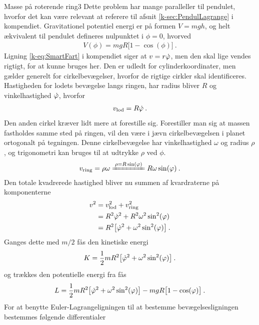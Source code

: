 %
%
\begin{opgave}{Masse på roterende ring}{3}
Dette problem har mange paralleller til pendulet, hvorfor det kan være relevant at referere til afsnit \ref{k-sec:PendulLagrange} i kompendiet.
\opg Gravitationel potentiel energi er på formen $V=mgh$, og helt ækvivalent til pendulet defineres nulpunktet i $\phi = 0$, hvorved
\begin{align*}
	V(\phi) = mgR\big[1 - \cos(\phi)\big] \: .
\end{align*}
\opg Ligning \eqref{k-eq:SmartFart} i kompendiet siger at $v = r\dot{\varphi}$, men den skal lige vendes rigtigt, for at kunne bruges her. Den er udledt for cylinderkoordinater, men gælder generelt for cirkelbevægelser, hvorfor de rigtige cirkler skal identificeres. Hastigheden for lodets bevægelse langs ringen, har radius bliver $R$ og vinkelhastighed $\dot{\varphi}$, hvorfor
\begin{align*}
	v_\mathrm{lod} = R\dot{\varphi} \: .
\end{align*}
Den anden cirkel kræver lidt mere at forestille sig. Forestiller man sig at massen fastholdes samme sted på ringen, vil den være i jævn cirkelbevægelsen i planet ortogonalt på tegningen. Denne cirkelbevægelse har vinkelhastighed $\omega$ og radius $\rho$, og trigonometri kan bruges til at udtrykke $\rho$ ved $\phi$.
\begin{align*}
	v_\mathrm{ring} = \rho\omega \xleq{\rho = R\sin(\phi)} R\omega\sin(\phi) \: .
\end{align*} 
\opg Den totale kvadrerede hastighed bliver nu summen af kvardraterne på komponenterne
\begin{align*}
	v^2 &= v_\mathrm{lod}^2 + v_\mathrm{ring}^2 \\
	&= R^2\dot{\varphi}^2 + R^2\omega^2\sin^2(\varphi) \\
	&= R^2\big[\dot{\varphi}^2 + \omega^2\sin^2(\varphi)\big] \: .
\end{align*}
Ganges dette med $m/2$ fås den kinetiske energi
\begin{align*}
	K = \frac{1}{2}mR^2\big[\dot{\varphi}^2 + \omega^2\sin^2(\varphi)\big] \: .
\end{align*}
og trækkes den potentielle energi fra fås
\begin{align*}
	L = \frac{1}{2}mR^2\big[\dot{\varphi}^2 + \omega^2\sin^2(\varphi)\big] - mgR\big[1-\cos(\varphi)\big] \: .
\end{align*}
\opg For at benytte Euler-Lagrangeligningen til at bestemme bevægelsesligningen bestemmes følgende differentialer
\begin{align*}

\end{align*}
\end{opgave}
